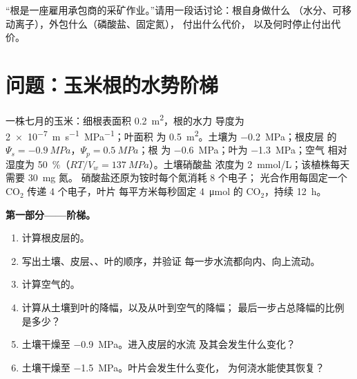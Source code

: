 \begin{exercise}[$\star\star\star$]\label{exo:b1:plant-water-minerals:12}
“根是一座雇用承包商的采矿作业。”请用一段话讨论：根自身做什么
（水分、可移动离子），外包什么（磷酸盐、固定氮），
付出什么代价，
以及何时停止付出代价。
\end{exercise}

\section{问题：玉米根的水势阶梯}

\begin{problem}
\label{pb:b1:plant-water-minerals:1}
一株七月的玉米：细根表面积 \qty{0.2}{m^2}，根的水力
导度为 \qty{2e-7}{m.s^{-1}.MPa^{-1}}；叶面积
为 \qty{0.5}{m^2}。土壤为 \qty{-0.2}{MPa}；根皮层
的 $\Psi_s = \qty{-0.9}{MPa}$，$\Psi_p = \qty{0.5}{MPa}$；根
为 \qty{-0.6}{MPa}；叶为 \qty{-1.3}{MPa}；空气
相对湿度为 \qty{50}{\%}（$RT/V_w = \qty{137}{MPa}$）。土壤硝酸盐
浓度为 \qty{2}{mmol/L}；该植株每天需要 \qty{30}{mg} 氮。
硝酸盐还原为铵时每个氮消耗 8 个电子；
光合作用每固定一个 $\mathrm{CO_2}$ 传递 4 个电子，叶片
每平方米每秒固定 \qty{4}{\micro mol} 的 $\mathrm{CO_2}$，持续
\qty{12}{h}。

\medskip
\noindent\textbf{第一部分——阶梯。}
\begin{enumerate}
  \item 计算根皮层的。
  \item 写出土壤、皮层、、叶的顺序，并验证
        每一步水流都向内、向上流动。
  \item 计算空气的。
  \item 计算从土壤到叶的降幅，以及从叶到空气的降幅；
        最后一步占总降幅的比例是多少？
  \item 土壤干燥至 \qty{-0.9}{MPa}。进入皮层的水流
        及其会发生什么变化？
  \item 土壤干燥至 \qty{-1.5}{MPa}。叶片会发生什么变化，
        为何浇水能使其恢复？
\end{enumerate}


\end{problem}
